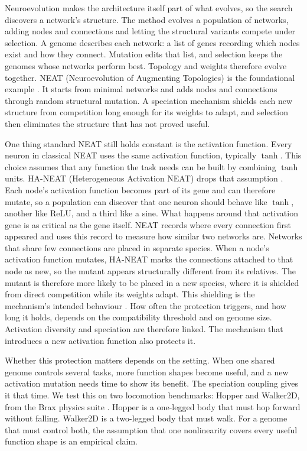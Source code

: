 \documentclass[12pt]{article}
\newcommand{\revGram}[2]{#2}
\newcommand{\revClarity}[2]{#2}
\newcommand{\revPlain}[2]{#2}
\begin{document}
Neuroevolution makes the architecture itself part of what evolves, so the search discovers a network's structure.
The method evolves a population of networks, adding nodes and connections and letting the structural variants compete under selection.
A genome describes each network: a list of genes recording which nodes exist and how they connect.
Mutation edits that list, and selection keeps the genomes whose networks perform best.
Topology and weights therefore evolve together.
NEAT (Neuroevolution of Augmenting Topologies) is the foundational example \parencite{stanley_evolving_2002}.
It starts from minimal networks and adds nodes and connections through random structural mutation. A speciation mechanism shields each new structure from competition long enough for its weights to adapt, and selection then eliminates \revPlain{P-01}{the structure that has not proved useful}.


One thing standard NEAT still holds constant is the activation function.
Every neuron in classical NEAT uses the same activation function, typically $\tanh$.
This choice assumes that any function the task needs can be built by combining $\tanh$ units.
HA-NEAT (Heterogeneous Activation NEAT) drops that assumption \parencite{hagg_evolving_2017}.
Each node's activation function becomes part of its gene and can therefore mutate, so a population can discover that one neuron should behave like $\tanh$, another like ReLU, and a third like a sine.
What happens around that activation gene is as critical as the gene itself.
NEAT records where every connection first appeared and uses this record to measure how similar two networks are. Networks that share few connections are placed in separate species.
When a node's activation function mutates, HA-NEAT marks the connections attached to that node as new, so the mutant appears structurally different from its relatives.
The mutant is therefore more likely to be placed in a new species, where it is shielded from direct competition while its weights adapt. \revClarity{L-01}{This shielding is the mechanism's intended behaviour} \parencite{hagg_evolving_2017}. How often the protection triggers, and how long it holds, depends on the compatibility threshold and on genome size.
Activation diversity and speciation are therefore linked. The mechanism that introduces a new activation function also protects it.

Whether this protection matters depends on the setting.
When one shared genome controls several tasks, more function shapes become useful, and a new activation mutation needs time to show its benefit.
The speciation coupling gives it that time.
\revGram{G-05}{We test this on two locomotion benchmarks: Hopper and Walker2D, from the Brax physics suite} \parencite{freeman_brax_2021}.
Hopper is a one-legged body that must hop forward without falling. Walker2D is a two-legged body that must walk.
For a genome that must control both, the assumption that one nonlinearity covers every useful function shape is an empirical claim.
\end{document}
